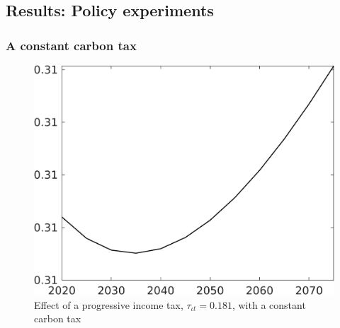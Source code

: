 \subsection{Results: Policy experiments}\label{app:polexp}


\subsubsection{A constant carbon tax}\label{app:polexp_cc}

\begin{figure}[h!!]
	\centering
	\caption{Effect of a progressive income tax, $\tau_{\iota t}=0.181$, with a constant carbon tax}		\label{fig:Efftaul_nsk0_xgr0_know_app}		
	\begin{minipage}[]{0.32\textwidth}
		\includegraphics[width=1\textwidth]{../../codding_model/own_basedOnFried/optimalPol_010922_revision/figures/all_13Sept22/CompTaufPER_bytaul_Reg0_sff_spillover0_nsk0_xgr0_knspil0_sep0_LFlimit0_emsbase0_countec0_GovRev0_etaa0.79_lgd0.png}
	\end{minipage}	
	\begin{minipage}[]{0.32\textwidth}

\end{minipage}
\end{figure}

